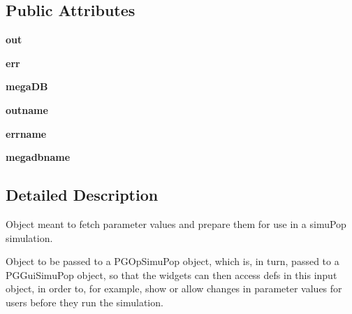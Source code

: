 \subsection*{Public Attributes}
\begin{DoxyCompactItemize}
\item 
{\bfseries out}\hypertarget{classpgoutputsimupop_1_1PGOutputSimuPop_ad1f018daa81e2bb66030141066afeb1c}{}\label{classpgoutputsimupop_1_1PGOutputSimuPop_ad1f018daa81e2bb66030141066afeb1c}

\item 
{\bfseries err}\hypertarget{classpgoutputsimupop_1_1PGOutputSimuPop_a345988926bd39be6bc4a14182e49e522}{}\label{classpgoutputsimupop_1_1PGOutputSimuPop_a345988926bd39be6bc4a14182e49e522}

\item 
{\bfseries mega\+DB}\hypertarget{classpgoutputsimupop_1_1PGOutputSimuPop_a4965a9d26324d081c71a5e7f17494f32}{}\label{classpgoutputsimupop_1_1PGOutputSimuPop_a4965a9d26324d081c71a5e7f17494f32}

\item 
{\bfseries outname}\hypertarget{classpgoutputsimupop_1_1PGOutputSimuPop_a5c7560f1b4b68e943f5f900cd27a417f}{}\label{classpgoutputsimupop_1_1PGOutputSimuPop_a5c7560f1b4b68e943f5f900cd27a417f}

\item 
{\bfseries errname}\hypertarget{classpgoutputsimupop_1_1PGOutputSimuPop_a109549817b2f81d6bbb0480e8b58a2b8}{}\label{classpgoutputsimupop_1_1PGOutputSimuPop_a109549817b2f81d6bbb0480e8b58a2b8}

\item 
{\bfseries megadbname}\hypertarget{classpgoutputsimupop_1_1PGOutputSimuPop_aad571ab6039c7478d64a909718688e47}{}\label{classpgoutputsimupop_1_1PGOutputSimuPop_aad571ab6039c7478d64a909718688e47}

\end{DoxyCompactItemize}


\subsection{Detailed Description}
\begin{DoxyVerb}Object meant to fetch parameter values and prepare them for 
use in a simuPop simulation.  

Object to be passed to a PGOpSimuPop object, which is, in turn,
passed to a PGGuiSimuPop object, so that the widgets can then access
defs in this input object, in order to, for example, show or allow
changes in parameter values for users before they run the simulation.
\end{DoxyVerb}
 

